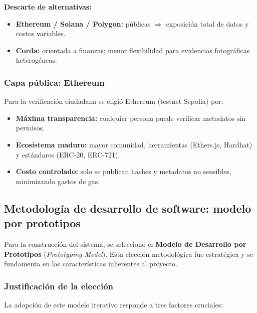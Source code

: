 \textbf{Descarte de alternativas:}
\begin{itemize}
    \item \textbf{Ethereum / Solana / Polygon:} públicas $\Rightarrow$ exposición total de datos y costos variables.
    \item \textbf{Corda:} orientada a finanzas; menor flexibilidad para evidencias fotográficas heterogéneas.
\end{itemize}

\subsubsection{Capa pública: Ethereum}

Para la verificación ciudadana se eligió Ethereum (testnet Sepolia) por:

\begin{itemize}
    \item \textbf{Máxima transparencia:} cualquier persona puede verificar metadatos sin permisos.
    
    \item \textbf{Ecosistema maduro:} mayor comunidad, herramientas (Ethers.js, Hardhat) y estándares (ERC-20, ERC-721).
    
    \item \textbf{Costo controlado:} solo se publican hashes y metadatos no sensibles, minimizando gastos de gas.
\end{itemize}

\subsection{Metodología de desarrollo de software: modelo por prototipos}

Para la construcción del sistema, se seleccionó el \textbf{Modelo de Desarrollo por Prototipos} (\textit{Prototyping Model}). Esta elección metodológica fue estratégica y se fundamenta en las características inherentes al proyecto.

\subsubsection{Justificación de la elección}

La adopción de este modelo iterativo responde a tres factores cruciales:

